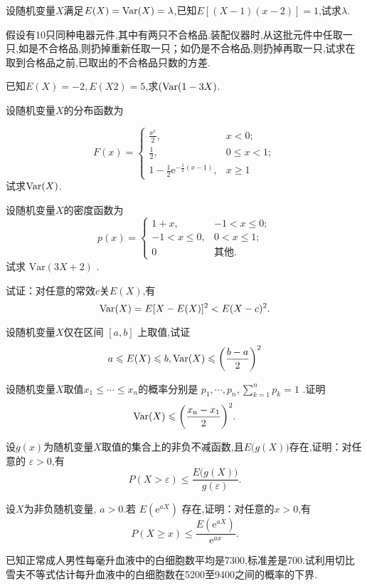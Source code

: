 \begin{xiti}

  \item 设随机变量$ X $满足$E(X)=\operatorname{Var} (X)=\lambda$,已知$ E[(X-1)(x-2)]=1 $,试求$\lambda$.

  \item 假设有10只同种电器元件,其中有两只不合格品.装配仪器时,从这批元件中任取一只,如是不合格品,则扔掉重新任取一只；如仍是不合格品,则扔掉再取一只,试求在取到合格品之前,已取出的不合格品只数的方差.

  \item 已知$ E(X)=-2,E(X2)=5 $,求$(\operatorname{Var} (1-3 X)$.

  \item 设随机变量$ X $的分布函数为

   \[
    F(x) = \begin{cases}
      \frac{\ee^x} 2, & x < 0;  \\
      \frac{1}{2},  & 0 \leqslant x < 1;  \\
      1-\frac{1}{2} \mathrm{e}^{-\frac12(x-1)}, & x \geqslant 1
    \end{cases}
    \]
    试求$\operatorname{Var} (X)$.

    \item 设随机变量$ X $的密度函数为
     \[
       p(x) = \begin{cases}
         1 + x, & -1<x \leqslant 0 ; \\
         -1<x \leqslant 0 , & 0<x \leqslant 1 ; \\
         0 & \text{其他}.
       \end{cases}
     \]
     试求 $\mathrm{Var}(3 X+2)$ .

    \item 试证：对任意的常效$ c $关$ E(X) $,有
    \[
      \operatorname{Var}(X) = E[X-E(X)]^{2} < E(X-c)^{2}.
     \]

    \item 设随机变量$X$仅在区间 $[a, b]$ 上取值,试证
    \[
      a \leqslant E(X) \leqslant b, \Var(X) \leqslant\left(\frac{b-a}{2}\right)^{2}
    \]

    \item 设随机变量$ X $取值$x_1\le \cdots \le x_n$的概率分别是 $p_1,\cdots,p_n,\sum_{k=1}^np_k=1$ .证明
    \[
     \Var(X) \leqslant\left(\frac{x_{\mathrm{n}}-x_{1}}{2}\right)^{2}.
    \]

    \item 设$g(x)$为随机变量$ X $取值的集合上的非负不减函数,且$ E\big(g(X)\big) $存在,证明：对任意的 $\varepsilon>0$,有
    \[
      P(X>\varepsilon) \leqslant \frac{E\big(g(X)\big)}{g(\varepsilon)}.
    \]

    \item 设$ X $为非负随机变量, $ a>0 $.若 $E(\mathrm{e}^{a X})$ 存在,证明：对任意的$ x>0 $,有
    \[
      P(X \geqslant x) \leqslant \frac{E (\mathrm{e}^{a X} )}{\mathrm{e}^{a x}}.
    \]

    \item 已知正常成人男性每毫升血液中的白细胞数平均是7300,标准差是700.试利用切比雪夫不等式估计每升血液中的白细胞数在5200至9400之间的概率的下界.
\end{xiti}

